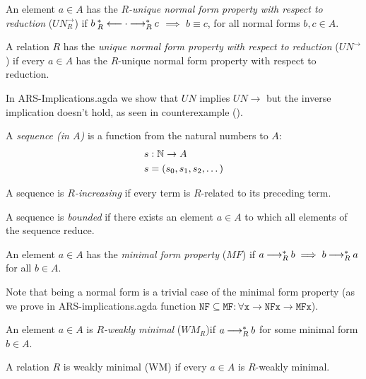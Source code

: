\begin{definition}
An element $a \in A$ has the \emph{${R}$-unique normal form property with respect to reduction} ($UN^ \to _{R}$) if
$b \mathbin{_R^*\longleftarrow}  \cdot  \mathbin{\longrightarrow_R^*} c$  $\implies$ $b \equiv c$, for all normal forms $b,c \in A$.

A relation $R$ has the \emph{unique normal form property with respect to reduction} ($UN^\to$) if every $a \in A$ has the
$R$-unique normal form property with respect to reduction.
\end{definition}
In ARS-Implications.agda we show that $UN$ implies $UN\to$ but the inverse implication doesn't hold, as seen 
in counterexample ().

\begin{definition}
    A \emph{sequence (in $A$)} is a function from the natural numbers to $A$:
    \begin{align*}
      &s : \mathbb{N} \to A \\
      &s = (s_0,s_1,s_2,\dots)
    \end{align*}
\end{definition}
  
\begin{definition}
    A sequence is \emph{$R$-increasing} if every term is $R$-related to its preceding term.
\end{definition}
  
\begin{definition}
    A sequence is \emph{bounded} if there exists an element $a \in A$ to which all elements of the sequence reduce.
\end{definition}

\begin{definition}
    An element $a \in A$ has the \emph{minimal form property} ($MF$) if $a \mathbin{\longrightarrow_R^*} b \implies b \mathbin{\longrightarrow_R^*} a$ for all $b \in A$.
\end{definition}

Note that being a normal form is a trivial case of the minimal form property (as we prove in ARS-implications.agda 
function $\mathtt{NF\subseteq MF : \forall {x} \to NF x \to MF x}$).

\begin{definition}
    An element $a \in A$ is \emph{$R$-weakly minimal} ($WM_{R}$)if $a \mathbin{\longrightarrow_R^*} b$ for some minimal form $b \in A$.
  
    A relation $R$ is weakly minimal (WM) if every $a \in A$ is $R$-weakly minimal.
\end{definition}

